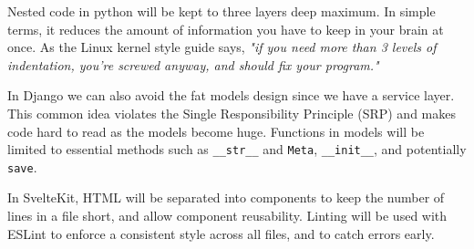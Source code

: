 Nested code in python will be kept to three layers deep maximum. In simple terms, it reduces the amount of information you have to keep in your brain at once. As the Linux kernel style guide says, \textit{"if you need more than 3 levels of indentation, you're screwed anyway, and should fix your program."} \parencite{the_kernel_development_community_linux_2024}

In Django we can also avoid the fat models design since we have a service layer. This common idea violates the Single Responsibility Principle (SRP) and makes code hard to read as the models become huge. Functions in models will be limited to essential methods such as \texttt{\_\_str\_\_} and \texttt{Meta}, \texttt{\_\_init\_\_}, and potentially \texttt{save}. 

In SvelteKit, HTML will be separated into components to keep the number of lines in a file short, and allow component reusability. Linting will be used with ESLint to enforce a consistent style across all files, and to catch errors early.